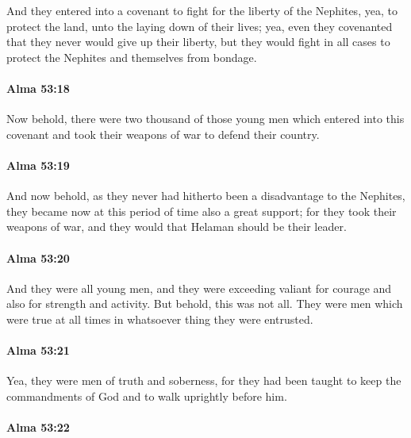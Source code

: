 			And they entered into a covenant
			to fight for the liberty of the Nephites,
			yea, to protect the land,
			unto the laying down of their lives;
			yea, even they covenanted that they never would give up their liberty,
			but they would fight in all cases
			to protect the Nephites and themselves from bondage.

		\paragraph{Alma 53:18} %
			\label{ALMA-53-18}

			Now behold, there were two thousand of those young men
			which entered into this covenant
			and took their weapons of war to defend their country.

		\paragraph{Alma 53:19} %
			\label{ALMA-53-19}

			And now behold, as they never had hitherto been a disadvantage to the Nephites,
			they became now at this period of time also a great support;
			for they took their weapons of war,
			and they would that Helaman should be their leader.

		\paragraph{Alma 53:20} %
			\label{ALMA-53-20}

			And they were all young men,
			and they were exceeding valiant for courage and also for strength and activity.
			But behold, this was not all.
			They were men which were true at all times
			in whatsoever thing they were entrusted.

		\paragraph{Alma 53:21} %
			\label{ALMA-53-21}

			Yea, they were men of truth and soberness,
			for they had been taught to keep the commandments of God
			and to walk uprightly before him.

		\paragraph{Alma 53:22} %
			\label{ALMA-53-22}

